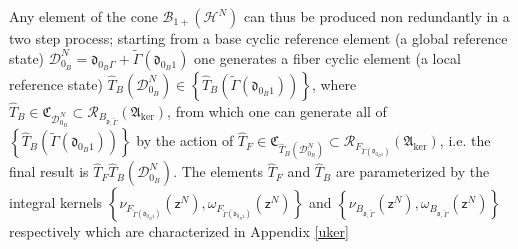\documentclass[aps,preprint]{revtex4}%
\begin{document}
Any element of the cone $\mathcal{B}_{1+}\left(  \mathcal{H}^{N}\right)  $ can
thus be produced non redundantly in a two step process; starting from a base
cyclic reference element (a global reference state) $\mathcal{D}_{0_{B}}%
^{N}=\mathfrak{d}_{0_{B}\Gamma}+\tilde{\Gamma}\left(  \mathfrak{d}_{0_{B}%
1}\right)  $ one generates a fiber cyclic element (a local reference state)
$\hat{T}_{B}\left(  \mathcal{D}_{0_{B}}^{N}\right)  \in\left\{  \hat{T}%
_{B}\left(  \tilde{\Gamma}\left(  \mathfrak{d}_{0_{B}1}\right)  \right)
\right\}  $, where $\hat{T}_{B}\in\mathfrak{C}_{\mathcal{D}_{0_{B}}^{N}%
}\subset\mathcal{R}_{B_{\mathfrak{d},\tilde{\Gamma}}}\left(  \mathfrak{A}%
_{\ker}\right)  $, from which one can generate all of $\left\{  \hat{T}%
_{B}\left(  \tilde{\Gamma}\left(  \mathfrak{d}_{0_{B}1}\right)  \right)
\right\}  $ by the action of $\hat{T}_{F}\in\mathfrak{C}_{\hat{T}_{B}\left(
\mathcal{D}_{0_{B}}^{N}\right)  }\subset\mathcal{R}_{F_{\tilde{\Gamma}\left(
\mathfrak{d}_{0_{B}1}\right)  }}\left(  \mathfrak{A}_{\ker}\right)  $, i.e.
the final result is $\hat{T}_{F}\hat{T}_{B}\left(  \mathcal{D}_{0_{B}}%
^{N}\right)  $. The elements $\hat{T}_{F}$ and $\hat{T}_{B}$ are parameterized
by the integral kernels $\left\{  \nu_{F_{\tilde{\Gamma}\left(  \mathfrak{d}%
_{0_{B}1}\right)  }}\left(  \mathsf{z}^{N}\right)  ,\omega_{F_{\tilde{\Gamma
}\left(  \mathfrak{d}_{0_{B}1}\right)  }}\left(  \mathsf{z}^{N}\right)
\right\}  $ and $\left\{  \nu_{B_{\mathfrak{d},\tilde{\Gamma}}}\left(
\mathsf{z}^{N}\right)  ,\omega_{B_{\mathfrak{d},\tilde{\Gamma}}}\left(
\mathsf{z}^{N}\right)  \right\}  $ respectively which are characterized in
Appendix \ref{uker}
\end{document}
